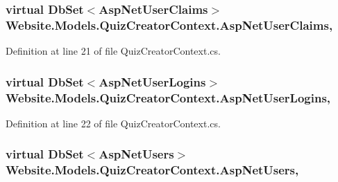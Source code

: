 \hypertarget{class_website_1_1_models_1_1_quiz_creator_context_ad8dc56b9e8485646bf6c6a179566a4a8}{}
\subsubsection[{Asp\+Net\+User\+Claims}]{\setlength{\rightskip}{0pt plus 5cm}virtual Db\+Set$<${\bf Asp\+Net\+User\+Claims}$>$ Website.\+Models.\+Quiz\+Creator\+Context.\+Asp\+Net\+User\+Claims\hspace{0.3cm}{\ttfamily [get]}, {\ttfamily [set]}}\label{class_website_1_1_models_1_1_quiz_creator_context_ad8dc56b9e8485646bf6c6a179566a4a8}


Definition at line 21 of file Quiz\+Creator\+Context.\+cs.

\hypertarget{class_website_1_1_models_1_1_quiz_creator_context_a8f0e3294fcc8f6ca7606865712ae2c89}{}
\subsubsection[{Asp\+Net\+User\+Logins}]{\setlength{\rightskip}{0pt plus 5cm}virtual Db\+Set$<${\bf Asp\+Net\+User\+Logins}$>$ Website.\+Models.\+Quiz\+Creator\+Context.\+Asp\+Net\+User\+Logins\hspace{0.3cm}{\ttfamily [get]}, {\ttfamily [set]}}\label{class_website_1_1_models_1_1_quiz_creator_context_a8f0e3294fcc8f6ca7606865712ae2c89}


Definition at line 22 of file Quiz\+Creator\+Context.\+cs.

\hypertarget{class_website_1_1_models_1_1_quiz_creator_context_a8f07c4d76f33bf1e98953c6b54e1963b}{}
\subsubsection[{Asp\+Net\+Users}]{\setlength{\rightskip}{0pt plus 5cm}virtual Db\+Set$<${\bf Asp\+Net\+Users}$>$ Website.\+Models.\+Quiz\+Creator\+Context.\+Asp\+Net\+Users\hspace{0.3cm}{\ttfamily [get]}, {\ttfamily [set]}}\label{class_website_1_1_models_1_1_quiz_creator_context_a8f07c4d76f33bf1e98953c6b54e1963b}


